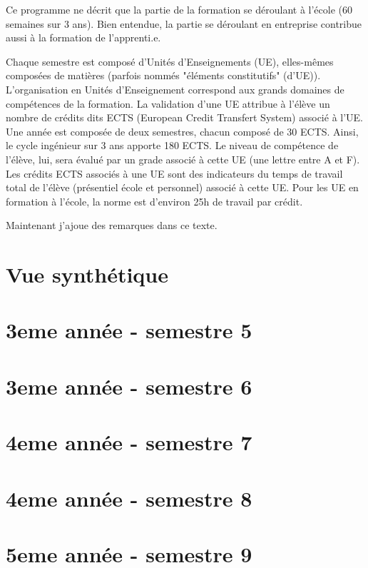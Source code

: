 \documentclass[a4paper, 11pt]{article}
\begin{document}
Ce programme ne décrit que la partie de la formation se déroulant à l'école (60 semaines sur 3 ans). Bien entendue, la partie se déroulant en entreprise contribue aussi à la formation de l'apprenti.e.

Chaque semestre est composé d'Unités d'Enseignements (UE), elles-mêmes composées de matières (parfois nommés "éléments constitutifs" (d'UE)). L'organisation en Unités d'Enseignement correspond aux grands domaines de compétences de la formation. La validation d'une UE attribue à l'élève un nombre de crédits dits ECTS (European Credit Transfert System) associé à l'UE. Une année est composée de deux semestres, chacun composé de 30 ECTS. Ainsi, le cycle ingénieur sur 3 ans apporte 180 ECTS. Le niveau de compétence de l'élève, lui, sera évalué par un grade associé à cette UE (une lettre entre A et F). Les crédits ECTS associés à une UE sont des indicateurs du temps de travail total de l'élève (présentiel école et personnel) associé à cette UE. Pour les UE en formation à l'école, la norme est d'environ 25h de travail par crédit.  

Maintenant j'ajoue des remarques dans ce texte.
 
\pagebreak

\tableofcontents
\pagebreak 
\part{Vue synthétique}
 \pagebreak
 \pagebreak
 \pagebreak
 \pagebreak

\part{3eme année - semestre 5}





\part{3eme année - semestre 6}





\part{4eme année - semestre 7}





\part{4eme année - semestre 8}





\part{5eme année - semestre 9}




\end{document}
